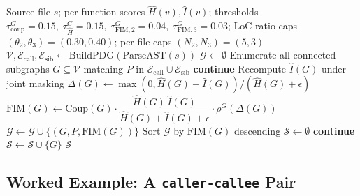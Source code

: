 \begin{algorithm}[h]
\caption{Multi-function group FIM target selection for one file.}
\label{alg:selection_multi}
\begin{algorithmic}[1]
  \Require Source file $s$; per-function scores $\hat{H}(v),\hat{I}(v)$;
           thresholds $\tau^G_{\mathrm{coup}}=0.15,\;\tau^G_{\hat H}=0.15,\;
           \tau^G_{\mathrm{FIM,2}}=0.04,\;\tau^G_{\mathrm{FIM,3}}=0.03$;
           LoC ratio caps $(\theta_2,\theta_3)=(0.30,0.40)$;
           per-file caps $(N_2, N_3)=(5, 3)$
  \State $\mathcal{V}, \mathcal{E}_{\mathrm{call}}, \mathcal{E}_{\mathrm{sib}} \gets \mathrm{BuildPDG}(\mathrm{ParseAST}(s))$
  \State $\mathcal{G} \gets \emptyset$
    \State Enumerate all connected subgraphs $G \subseteq \mathcal{V}$ matching $P$
           in $\mathcal{E}_{\mathrm{call}}\cup\mathcal{E}_{\mathrm{sib}}$
        \State \textbf{continue}
      \EndIf
      \State Recompute $\hat{I}(G)$ under joint masking
      \State $\Delta(G) \gets \max(0, \hat{H}(G)-\hat{I}(G))/(\hat{H}(G)+\epsilon)$
      \State $\mathrm{FIM}(G) \gets \mathrm{Coup}(G)\cdot
              \dfrac{\hat{H}(G)\,\hat{I}(G)}{\hat{H}(G)+\hat{I}(G)+\epsilon}\cdot \rho^G(\Delta(G))$
        \State $\mathcal{G} \gets \mathcal{G} \cup \{(G,P,\mathrm{FIM}(G))\}$
      \EndIf
    \EndFor
  \EndFor
  \State Sort $\mathcal{G}$ by $\mathrm{FIM}(G)$ descending
  \State $\mathcal{S} \gets \emptyset$
      \State \textbf{continue}
    \EndIf
    \State $\mathcal{S} \gets \mathcal{S} \cup \{G\}$
  \EndFor
  \State \Return $\mathcal{S}$
\end{algorithmic}
\end{algorithm}

\subsection{Worked Example: A \texttt{caller-callee} Pair}
\label{app:algo:groups_example}

